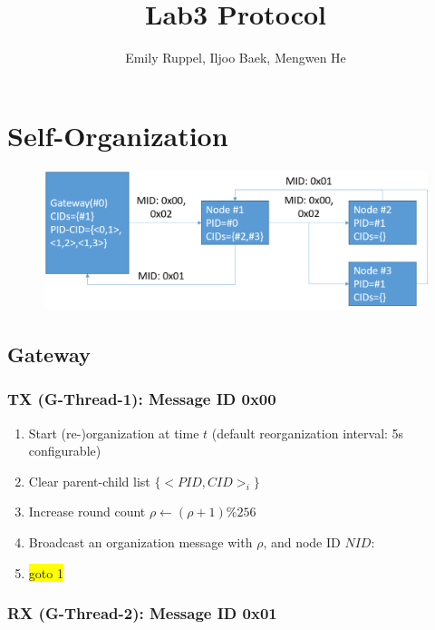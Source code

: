 \documentclass[letterpaper,9pt]{article}
\title{\textbf{Lab3 Protocol}}
\author{Emily Ruppel, Iljoo Baek, Mengwen He}
\begin{document}
\maketitle
\tableofcontents
\newpage

\section{Self-Organization}

\begin{figure}[!h]
	\centering
	\includegraphics[width=12cm]{./img/selforganization.png}
\end{figure}

\subsection{Gateway}

\subsubsection{TX (G-Thread-1): Message ID 0x00}

\begin{enumerate}
	\item Start (re-)organization at time $t$ (default reorganization interval: 5s configurable)
		\item Clear parent-child list $\{<PID,CID>_i\}$
		\item Increase round count $\rho\leftarrow(\rho+1)\%256$
	\item Broadcast an organization message with $\rho$, and node ID $NID$:\\
	\item \colorbox{yellow}{goto 1}
\end{enumerate}

\subsubsection{RX (G-Thread-2): Message ID 0x01}
\end{document}
